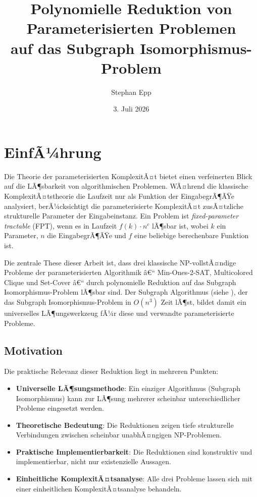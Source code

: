 ﻿\documentclass[a4paper,12pt]{article}
\title{Polynomielle Reduktion von Parameterisierten Problemen\\auf das Subgraph Isomorphismus-Problem}
\author{Stephan Epp}
\date{3. Juli 2026}
\theoremstyle{definition}
\begin{document}
	
\maketitle

\tableofcontents
\newpage

\section{EinfÃ¼hrung}

Die Theorie der parameterisierten KomplexitÃ¤t bietet einen verfeinerten Blick auf die LÃ¶sbarkeit von algorithmischen Problemen. WÃ¤hrend die klassische KomplexitÃ¤tstheorie die Laufzeit nur als Funktion der EingabegrÃ¶ÃŸe analysiert, berÃ¼cksichtigt die parameterisierte KomplexitÃ¤t zusÃ¤tzliche strukturelle Parameter der Eingabeinstanz. Ein Problem ist \emph{fixed-parameter tractable} (FPT), wenn es in Laufzeit $f(k) \cdot n^c$ lÃ¶sbar ist, wobei $k$ ein Parameter, $n$ die EingabegrÃ¶ÃŸe und $f$ eine beliebige berechenbare Funktion ist.

Die zentrale These dieser Arbeit ist, dass drei klassische NP-vollstÃ¤ndige Probleme der parameterisierten Algorithmik â€“ Min-Ones-2-SAT, Multicolored Clique und Set-Cover â€“ durch polynomielle Reduktion auf das Subgraph Isomorphismus-Problem lÃ¶sbar sind. Der Subgraph Algorithmus (siehe \cite{subgraph2026}), der das Subgraph Isomorphismus-Problem in $O(n^3)$ Zeit lÃ¶st, bildet damit ein universelles LÃ¶ungswerkzeug fÃ¼r diese und verwandte parameterisierte Probleme.

\subsection{Motivation}

Die praktische Relevanz dieser Reduktion liegt in mehreren Punkten:

\begin{itemize}
	\item \textbf{Universelle LÃ¶sungsmethode}: Ein einziger Algorithmus (Subgraph Isomorphismus) kann zur LÃ¶sung mehrerer scheinbar unterschiedlicher Probleme eingesetzt werden.
	
	\item \textbf{Theoretische Bedeutung}: Die Reduktionen zeigen tiefe strukturelle Verbindungen zwischen scheinbar unabhÃ¤ngigen NP-Problemen.
	
	\item \textbf{Praktische Implementierbarkeit}: Die Reduktionen sind konstruktiv und implementierbar, nicht nur existenzielle Aussagen.
	
	\item \textbf{Einheitliche KomplexitÃ¤tsanalyse}: Alle drei Probleme lassen sich mit einer einheitlichen KomplexitÃ¤tsanalyse behandeln.
\end{itemize}
\end{document}
